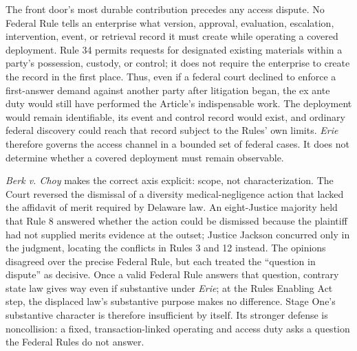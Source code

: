 The front door's most durable contribution precedes any access dispute. No Federal Rule tells an enterprise what version, approval, evaluation, escalation, intervention, event, or retrieval record it must create while operating a covered deployment. Rule 34 permits requests for designated existing materials within a party's possession, custody, or control; it does not require the enterprise to create the record in the first place. Thus, even if a federal court declined to enforce a first-answer demand against another party after litigation began, the ex ante duty would still have performed the Article's indispensable work. The deployment would remain identifiable, its event and control record would exist, and ordinary federal discovery could reach that record subject to the Rules' own limits. \emph{Erie} therefore governs the access channel in a bounded set of federal cases. It does not determine whether a covered deployment must remain observable.

\emph{Berk v. Choy} makes the correct axis explicit: scope, not characterization. The Court reversed the dismissal of a diversity medical-negligence action that lacked the affidavit of merit required by Delaware law. An eight-Justice majority held that Rule 8 answered whether the action could be dismissed because the plaintiff had not supplied merits evidence at the outset; Justice Jackson concurred only in the judgment, locating the conflicts in Rules 3 and 12 instead. The opinions disagreed over the precise Federal Rule, but each treated the ``question in dispute'' as decisive. Once a valid Federal Rule answers that question, contrary state law gives way even if substantive under \emph{Erie}; at the Rules Enabling Act step, the displaced law's substantive purpose makes no difference. Stage One's substantive character is therefore insufficient by itself. Its stronger defense is noncollision: a fixed, transaction-linked operating and access duty asks a question the Federal Rules do not answer.

